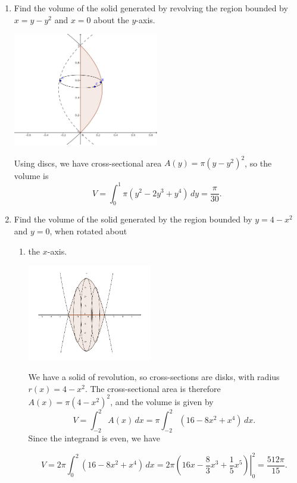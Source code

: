 \documentclass[12pt]{article}
\begin{document}
\begin{enumerate}
 \item Find the volume of the solid generated by revolving the region bounded by $x=y-y^2$ and $x=0$ about the $y$-axis.
 
 \medskip
 
 \begin{multicols}{2}
\begin{center}
 \includegraphics[width=0.5\textwidth]{WS5-4.png}
\end{center}

Using discs, we have cross-sectional area $A(y) = \pi(y-y^2)^2$, so the volume is
\[
 V = \int_0^1 \pi(y^2-2y^3+y^4)\,dy = \frac{\pi}{30}.
\]
\end{multicols}

\pagebreak

 \item Find the volume of the solid generated by the region bounded by $y=4-x^2$ and $y=0$, when rotated about

\begin{enumerate}
 \item the $x$-axis.

\medskip
\begin{multicols}{2}
 \includegraphics[width=0.45\textwidth]{WS4-2ci}


We have a solid of revolution, so cross-sections are disks, with radius $r(x)=4-x^2$. The cross-sectional area is therefore $A(x)=\pi(4-x^2)^2$, and the volume is given by
\[
 V = \int_{-2}^2A(x)\,dx = \pi\int_{-2}^2(16-8x^2+x^4)\,dx.
\]
Since the integrand is even, we have
\end{multicols}
\[
 V=2\pi\int_0^2(16-8x^2+x^4)\,dx = 2\pi\left.\left(16x-\frac{8}{3}x^3+\frac{1}{5}x^5\right)\right|_0^2 = \frac{512\pi}{15}.
\]


\end{enumerate}
\end{enumerate}
\end{document}
